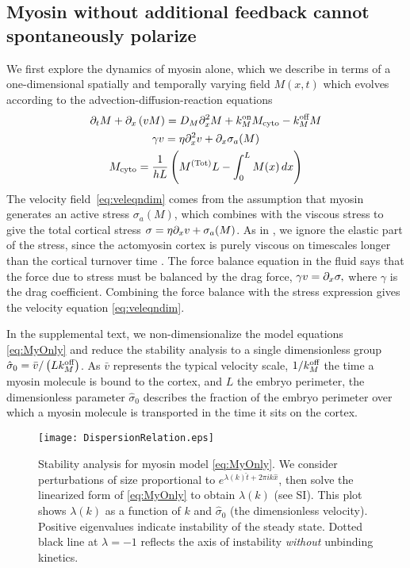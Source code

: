 \documentclass[11pt]{article}
\newcommand{\6}[1]{#1_{\text{6}}}
\newcommand{\3}[1]{#1_{\text{3}}}
\newcommand{\Tot}[1]{#1^\text{(Tot)}}
\newcommand{\My}[1]{#1_M}
\begin{document}
\subsection{Myosin without additional feedback cannot spontaneously polarize \label{sec:myosin}}
We first explore the dynamics of myosin alone, which we describe in terms of a one-dimensional spatially and temporally varying field $M(x,t)$ which evolves according to the advection-diffusion-reaction equations \cite{bois2011pattern}
\begin{subequations}
\label{eq:MyOnly}
\begin{gather}
\Dt M + \Dx \left(v M\right) = D_M \Dx^2 M +\My{\kon}M_\text{cyto} - \My{\koff} M \\
\label{eq:veleqndim}
\gamma v = \eta \Dx^2 v + \Dx \sigma_a(M)\\
M_\text{cyto} = \frac{1}{hL}\left(\Tot{M}L-\int_0^L M(x) \, dx\right)
\end{gather}
\end{subequations}
The velocity field\ \eqref{eq:veleqndim} comes from the assumption that myosin generates an active stress $\sigma_a(M)$, which combines with the viscous stress to give the total cortical stress $\sigma = \eta \partial_x{v} + \sigma_a(M)$. As in \cite{bois2011pattern}, we ignore the elastic part of the stress, since the actomyosin cortex is purely viscous on timescales longer than the cortical turnover time \cite{mayer2010anisotropies}. The force balance equation in the fluid says that the force due to stress must be balanced by the drag force, $\gamma v = \partial_x \sigma,$
where $\gamma$ is the drag coefficient. Combining the force balance with the stress expression gives the velocity equation \eqref{eq:veleqndim}.

In the supplemental text, we non-dimensionalize the model equations \eqref{eq:MyOnly} and reduce the stability analysis to a single dimensionless group $\hat{\sigma}_0 = \bar v/\left( L \My{\koff}\right)$. As $\bar v$ represents the typical velocity scale, $1/\My{\koff}$ the time a myosin molecule is bound to the cortex, and $L$ the embryo perimeter, the dimensionless parameter $\hat \sigma_0$ 
describes the fraction of the embryo perimeter over which a myosin molecule is transported in the time it sits on the cortex.


\begin{figure}
\centering
\texttt{[image: DispersionRelation.eps]}
\caption{\label{fig:DispRelMy} Stability analysis for myosin model \eqref{eq:MyOnly}. We consider perturbations of size proportional to $e^{\lambda(k) \hat{t}+2 \pi i k \hat{x}}$, then solve the linearized form of \eqref{eq:MyOnly} to obtain $\lambda(k)$ (see SI). This plot shows $\lambda(k)$ as a function of $k$ and $\hat{\sigma}_0$ (the dimensionless velocity). Positive eigenvalues indicate instability of the steady state. Dotted black line at $\lambda=-1$ reflects the axis of instability \emph{without} unbinding kinetics.}
\end{figure}
\end{document}
